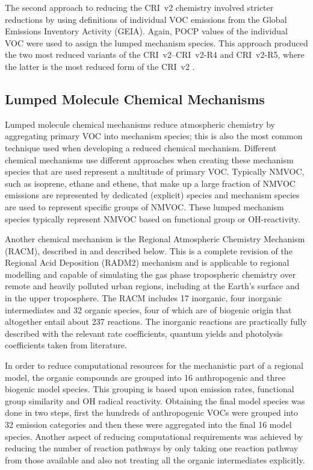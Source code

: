 The second approach to reducing the CRI~v2 chemistry involved stricter reductions by using definitions of individual VOC emissions from the Global Emissions Inventory Activity (GEIA).
Again, POCP values of the individual VOC were used to assign the lumped mechanism species.
This approach produced the two most reduced variants of the CRI~v2--CRI~v2-R4 and CRI~v2-R5, where the latter is the most reduced form of the CRI~v2 \citep{Watson:2008}.

\subsection{Lumped Molecule Chemical Mechanisms} \label{ss:lumped_molecule}
Lumped molecule chemical mechanisms reduce atmospheric chemistry by aggregating primary VOC into mechanism species; this is also the most common technique used when developing a reduced chemical mechanism.
Different chemical mechanisms use different approaches when creating these mechanism species that are used represent a multitude of primary VOC.
Typically NMVOC, such as isoprene, ethane and ethene, that make up a large fraction of NMVOC emissions are represented by dedicated (explicit) species and mechanism species are used to represent specific groups of NMVOC.
These lumped mechanism species typically represent NMVOC based on functional group or OH-reactivity.

Another chemical mechanism is the Regional Atmospheric Chemistry Mechanism (RACM), described in \citep{Stockwell:1997} and described below. 
This is a complete revision of the Regional Acid Deposition (RADM2) mechanism and is applicable to regional modelling and capable of simulating the gas phase tropospheric chemistry over remote and heavily polluted urban regions, including at the Earth's surface and in the upper troposphere. 
The RACM includes 17 inorganic, four inorganic intermediates and 32 organic species, four of which are of biogenic origin that altogether entail about 237 reactions. 
The inorganic reactions are practically fully described with the relevant rate coefficients, quantum yields and photolysis coefficients taken from literature.

In order to reduce computational resources for the mechanistic part of a regional model, the organic compounds are grouped into 16 anthropogenic and three biogenic model species. 
This grouping is based upon emission rates, functional group similarity and OH radical reactivity. 
Obtaining the final model species was done in two steps, first the hundreds of anthropogenic VOCs were grouped into 32 emission categories and then these were aggregated into the final 16 model species. 
Another aspect of reducing computational requirements was achieved by reducing the number of reaction pathways by only taking one reaction pathway from those available and also not treating all the organic intermediates explicitly.

